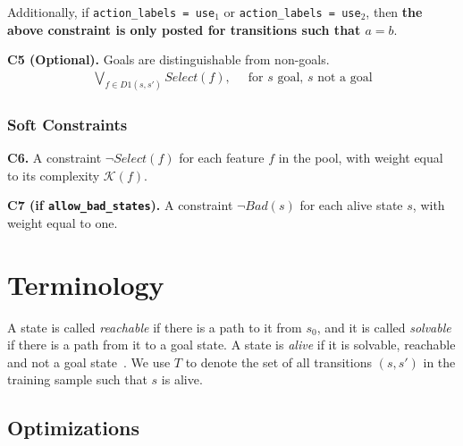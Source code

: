 \documentclass[a4paper]{article}
\newcommand{\smallpar}[1]{{\vspace{10pt}\noindent \bf #1.}}
\begin{document}
Additionally, if \texttt{action\_labels = use$_1$} or \texttt{action\_labels = use$_2$}, then
\textbf{the above constraint is only posted for transitions such that $a=b$}.


\smallpar{C5 (Optional)}
Goals are distinguishable from non-goals.
\begin{align*}
\bigvee_{f \in D1(s, s')} Select(f),&\;\; \text{for $s$ goal, $s$ not a goal}
\end{align*}


%

\subsubsection{Soft Constraints}
\smallpar{C6}
A constraint $\neg Select(f)$ for each feature $f$ in the pool, with weight equal to its complexity $\mathcal{K}(f)$.

\smallpar{C7 (if \texttt{allow\_bad\_states})}
A constraint $\neg Bad(s)$ for each alive state $s$, with weight equal to one.

\pagebreak



\section{Terminology}
A state is called \emph{reachable} if there is a path to it from $s_0$, and
it is called \emph{solvable} if there is a path from it to a goal
state.
A state is \emph{alive} if it is solvable, reachable and not a
goal state~\cite{frances-et-al-ijcai2019}.
We use $T$ to denote the set of all transitions $(s, s')$ in the training sample such that $s$ is alive.

\subsection{Optimizations}
\end{document}

